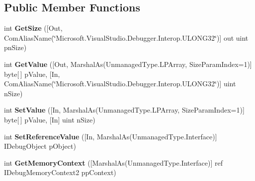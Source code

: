 \subsection*{Public Member Functions}
\begin{DoxyCompactItemize}
\item 
\hypertarget{interface_microsoft_1_1_visual_studio_1_1_debugger_1_1_interop_e_e_1_1_i_debug_function_object_acb12f1d01c9e417ceee537712eef47cf}{int {\bfseries Get\+Size} (\mbox{[}Out, Com\+Alias\+Name(\char`\"{}Microsoft.\+Visual\+Studio.\+Debugger.\+Interop.\+U\+L\+O\+N\+G32\char`\"{})\mbox{]} out uint pn\+Size)}\label{interface_microsoft_1_1_visual_studio_1_1_debugger_1_1_interop_e_e_1_1_i_debug_function_object_acb12f1d01c9e417ceee537712eef47cf}

\item 
\hypertarget{interface_microsoft_1_1_visual_studio_1_1_debugger_1_1_interop_e_e_1_1_i_debug_function_object_a8f191edd3486bbe8bebbe85d58b1b68b}{int {\bfseries Get\+Value} (\mbox{[}Out, Marshal\+As(Unmanaged\+Type.\+L\+P\+Array, Size\+Param\+Index=1)\mbox{]} byte\mbox{[}$\,$\mbox{]} p\+Value, \mbox{[}In, Com\+Alias\+Name(\char`\"{}Microsoft.\+Visual\+Studio.\+Debugger.\+Interop.\+U\+L\+O\+N\+G32\char`\"{})\mbox{]} uint n\+Size)}\label{interface_microsoft_1_1_visual_studio_1_1_debugger_1_1_interop_e_e_1_1_i_debug_function_object_a8f191edd3486bbe8bebbe85d58b1b68b}

\item 
\hypertarget{interface_microsoft_1_1_visual_studio_1_1_debugger_1_1_interop_e_e_1_1_i_debug_function_object_abb1f86199d6f792b580dc1e4b7877ef9}{int {\bfseries Set\+Value} (\mbox{[}In, Marshal\+As(Unmanaged\+Type.\+L\+P\+Array, Size\+Param\+Index=1)\mbox{]} byte\mbox{[}$\,$\mbox{]} p\+Value, \mbox{[}In\mbox{]} uint n\+Size)}\label{interface_microsoft_1_1_visual_studio_1_1_debugger_1_1_interop_e_e_1_1_i_debug_function_object_abb1f86199d6f792b580dc1e4b7877ef9}

\item 
\hypertarget{interface_microsoft_1_1_visual_studio_1_1_debugger_1_1_interop_e_e_1_1_i_debug_function_object_a42da67ee5ed69ba412e7f77b2d048bd2}{int {\bfseries Set\+Reference\+Value} (\mbox{[}In, Marshal\+As(Unmanaged\+Type.\+Interface)\mbox{]} I\+Debug\+Object p\+Object)}\label{interface_microsoft_1_1_visual_studio_1_1_debugger_1_1_interop_e_e_1_1_i_debug_function_object_a42da67ee5ed69ba412e7f77b2d048bd2}

\item 
\hypertarget{interface_microsoft_1_1_visual_studio_1_1_debugger_1_1_interop_e_e_1_1_i_debug_function_object_ae8b9ae15e2f8ae79ead5e8b168500601}{int {\bfseries Get\+Memory\+Context} (\mbox{[}Marshal\+As(Unmanaged\+Type.\+Interface)\mbox{]} ref I\+Debug\+Memory\+Context2 pp\+Context)}\label{interface_microsoft_1_1_visual_studio_1_1_debugger_1_1_interop_e_e_1_1_i_debug_function_object_ae8b9ae15e2f8ae79ead5e8b168500601}


\end{DoxyCompactItemize}
